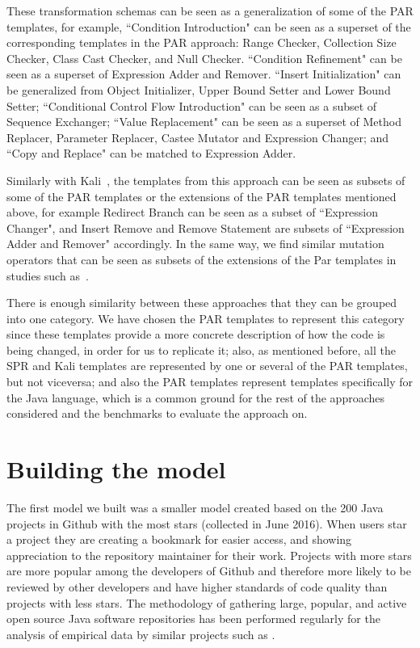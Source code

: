 \documentclass[conference]{IEEEtran}
\begin{document}
These transformation schemas can be seen as a generalization of some of the PAR 
templates, for example, ``Condition Introduction" can be seen as a superset of 
the corresponding templates in the PAR approach: Range Checker, Collection Size 
Checker, Class Cast Checker, and Null Checker. ``Condition Refinement" can be 
seen as a superset of 
Expression Adder and Remover. ``Insert Initialization" can be 
generalized from Object Initializer, Upper Bound Setter and Lower Bound Setter; ``Conditional Control Flow Introduction" can be 
seen as a subset of Sequence Exchanger;
``Value Replacement" can be seen as a superset of Method 
Replacer, Parameter Replacer, Castee Mutator and Expression Changer; and ``Copy 
and Replace" can be matched to Expression Adder. 

Similarly with Kali~\cite{Qi15}, the templates from this approach can be seen as subsets of some of the PAR templates or the extensions of the PAR templates mentioned above, for example Redirect Branch can be seen as a subset of ``Expression Changer", and Insert Remove and Remove Statement are subsets of ``Expression Adder and Remover" accordingly. In the same way, we find similar mutation operators that can be seen as subsets of the extensions of the Par templates in studies such as~\cite{Offutt96,Offutt06}.

There is enough similarity between these approaches that they can be grouped 
into one category. We have chosen the PAR templates to represent this category 
since these templates provide a more concrete description of how the code is 
being changed, in order for us to replicate it; also, as mentioned before, all the SPR and Kali templates are represented by one or several of the PAR templates, but not viceversa; and also the PAR templates represent templates specifically for the Java language, which is a common ground for the rest of the 
approaches considered and the benchmarks to evaluate the approach on.


\section{Building the model}
The first model we built was a smaller model created based on the 200 Java projects in Github 
with the most stars (collected in June 2016). When users star a project they are creating a bookmark for 
easier access, and showing appreciation to the repository maintainer for their 
work. Projects with more stars are more popular among the developers of Github 
and therefore more likely to be reviewed by other developers and have higher 
standards of code quality than projects with less stars. The methodology of 
gathering large,
popular, and active open source Java software repositories has been performed 
regularly for the analysis of empirical data by similar projects such as 
\cite{Ray14}. 
\end{document}
